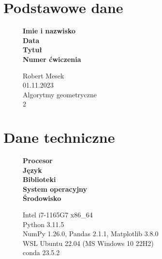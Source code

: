\documentclass[12pt]{article}
\begin{document}
\section*{Podstawowe dane}
\begin{figure}[htp]
	\begin{minipage}[t]{0.3\textwidth}
		\textbf{Imie i nazwisko} \\
		\textbf{Data} \\
		\textbf{Tytuł} \\
		\textbf{Numer ćwiczenia}
	\end{minipage}%
	\begin{minipage}[t]{0.6\textwidth}
		Robert Mesek \\
		01.11.2023 \\
		Algorytmy geometryczne \\
		2
	\end{minipage}%
\end{figure}

\section*{Dane techniczne}
\begin{figure}[htp]
	\begin{minipage}[t]{0.3\textwidth}
		\textbf{Procesor} \\
		\textbf{Język} \\
		\textbf{Biblioteki} \\
		\textbf{System operacyjny} \\
		\textbf{Środowisko}

	\end{minipage}%
	\begin{minipage}[t]{0.6\textwidth}
		Intel i7-1165G7 x86\_64 \\
		Python 3.11.5 \\
		NumPy 1.26.0, Pandas 2.1.1, Matplotlib 3.8.0 \\
		WSL Ubuntu 22.04 (MS Windows 10 22H2) \\
		conda 23.5.2
	\end{minipage}%
\end{figure}
\end{document}
